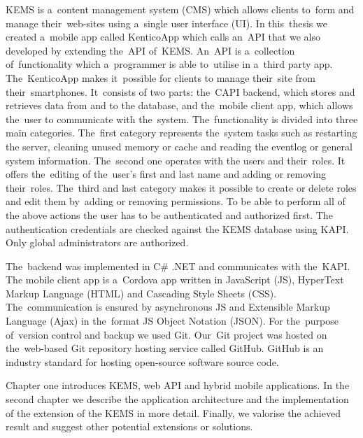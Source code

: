 \label{introduction}
KEMS is a~content management system (CMS) which allows clients to~form and manage their~web-sites using a~single user interface (UI). In this~thesis we created a~mobile app called KenticoApp which calls an~API that we also developed by extending the~API of~KEMS. An~API is a~collection of~functionality which a~programmer is able to~utilise in a~third party app. The~KenticoApp makes it~possible for clients to manage their~site from their~smartphones. It~consists of two parts: the~CAPI backend, which stores and retrieves data from and to the database, and the~mobile client app, which allows the~user to communicate with the~system.  The~functionality is divided into three main categories. The~first category represents the~system tasks such as restarting the server, cleaning unused memory or cache and reading the eventlog or general system information. The~second one operates with the users and their~roles. It offers the~editing of the~user's first and last name and adding or removing their~roles. The~third and last category makes it possible to create or delete roles and edit them by~adding or removing permissions. To be able to perform all of the above actions the user has to be authenticated and authorized first. The authentication credentials are checked against the KEMS database using KAPI. Only global administrators are authorized.

The~backend was implemented in C\# .NET and communicates with the~KAPI. The mobile client app is a~Cordova app written in JavaScript (JS), HyperText Markup Language (HTML) and Cascading Style Sheets (CSS). The~communication is ensured by asynchronous JS and Extensible Markup Language (Ajax) in the~format JS Object Notation (JSON). For the~purpose of~version control and backup we used Git. Our~Git project was hosted on the~web-based Git repository hosting service called GitHub. GitHub is an industry standard for hosting open-source software source code. 

Chapter one introduces KEMS, web API and hybrid mobile applications. In the second chapter we describe the application architecture and the implementation of the extension of the KEMS in more detail. Finally, we valorise the achieved result and suggest other potential extensions or solutions.
